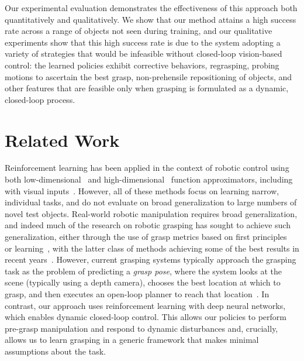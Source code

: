 \documentclass{article}
\begin{document}
Our experimental evaluation demonstrates the effectiveness of this approach both quantitatively and qualitatively. We show that our method attains a high success rate across a range of objects not seen during training, and our qualitative experiments show that this high success rate is due to the system adopting a variety of strategies that would be infeasible without closed-loop vision-based control: the learned policies exhibit corrective behaviors, regrasping, probing motions to ascertain the best grasp, non-prehensile repositioning of objects, and other features that are feasible only when grasping is formulated as a dynamic, closed-loop process.







\section{Related Work}

Reinforcement learning has been applied in the context of robotic control using both low-dimensional~\citep{peters_2008, kalakris11} and high-dimensional~\citep{hafner11, lillicrap15} function approximators, including with visual inputs~\citep{levine2015,yahya17}. However, all of these methods focus on learning narrow, individual tasks, and do not evaluate on broad generalization to large numbers of novel test objects. Real-world robotic manipulation requires broad generalization, and indeed much of the research on robotic grasping has sought to achieve such generalization, either through the use of grasp metrics based on first principles~\citep{weisz2012} or learning~\citep{lenz2015,bohg2014}, with the latter class of methods achieving some of the best results in recent years~\citep{platt_gpd_17,dexnet30_2017}. However, current grasping systems typically approach the grasping task as the problem of predicting a \emph{grasp pose}, where the system looks at the scene (typically using a depth camera), chooses the best location at which to grasp, and then executes an open-loop planner to reach that location~\citep{zeng2018, juxi18, dexnet30_2017, platt_gpd_17}. In contrast, our approach uses reinforcement learning with deep neural networks, which enables dynamic closed-loop control. This allows our policies to perform pre-grasp manipulation and respond to dynamic disturbances and, crucially, allows us to learn grasping in a generic framework that makes minimal assumptions about the task.
\end{document}
